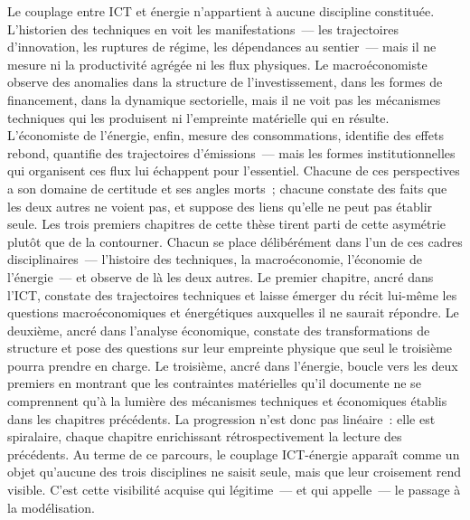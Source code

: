 Le couplage entre ICT et énergie n'appartient à aucune discipline constituée. L'historien des techniques en voit les manifestations~--- les trajectoires d'innovation, les ruptures de régime, les dépendances au sentier~--- mais il ne mesure ni la productivité agrégée ni les flux physiques. Le macroéconomiste observe des anomalies dans la structure de l'investissement, dans les formes de financement, dans la dynamique sectorielle, mais il ne voit pas les mécanismes techniques qui les produisent ni l'empreinte matérielle qui en résulte. L'économiste de l'énergie, enfin, mesure des consommations, identifie des effets rebond, quantifie des trajectoires d'émissions~--- mais les formes institutionnelles qui organisent ces flux lui échappent pour l'essentiel. Chacune de ces perspectives a son domaine de certitude et ses angles morts~; chacune constate des faits que les deux autres ne voient pas, et suppose des liens qu'elle ne peut pas établir seule. Les trois premiers chapitres de cette thèse tirent parti de cette asymétrie plutôt que de la contourner. Chacun se place délibérément dans l'un de ces cadres disciplinaires~--- l'histoire des techniques, la macroéconomie, l'économie de l'énergie~--- et observe de là les deux autres. Le premier chapitre, ancré dans l'ICT, constate des trajectoires techniques et laisse émerger du récit lui-même les questions macroéconomiques et énergétiques auxquelles il ne saurait répondre. Le deuxième, ancré dans l'analyse économique, constate des transformations de structure et pose des questions sur leur empreinte physique que seul le troisième pourra prendre en charge. Le troisième, ancré dans l'énergie, boucle vers les deux premiers en montrant que les contraintes matérielles qu'il documente ne se comprennent qu'à la lumière des mécanismes techniques et économiques établis dans les chapitres précédents. La progression n'est donc pas linéaire~: elle est spiralaire, chaque chapitre enrichissant rétrospectivement la lecture des précédents. Au terme de ce parcours, le couplage ICT-énergie apparaît comme un objet qu'aucune des trois disciplines ne saisit seule, mais que leur croisement rend visible. C'est cette visibilité acquise qui légitime~--- et qui appelle~--- le passage à la modélisation.

\newpage

